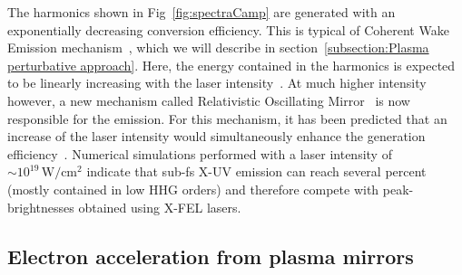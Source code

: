 \noindent The harmonics shown in Fig~\ref{fig:spectraCamp} are generated with an exponentially decreasing conversion efficiency. This is typical of Coherent Wake Emission mechanism~\cite{Quere2006}, which we will describe in section~\ref{subsection:Plasma perturbative approach}. Here, the energy contained in the harmonics is expected to be linearly increasing with the laser intensity~\cite{plaja1998generation,thaury2010high}. At much higher intensity however, a new mechanism called Relativistic Oscillating Mirror~\cite{Thaury2007} is now responsible for the emission. For this mechanism, it has been predicted that an increase of the laser intensity would simultaneously enhance the generation efficiency~\cite{thaury2010high}. Numerical simulations performed with a laser intensity of $\sim 10^{19}\,\mathrm{W/cm^2}$ indicate that sub-fs X-UV emission can reach several percent~\cite{Naumova2004} (mostly contained in low HHG orders) and therefore compete with peak-brightnesses obtained using X-FEL lasers.


 \subsection{Electron acceleration from plasma mirrors}

